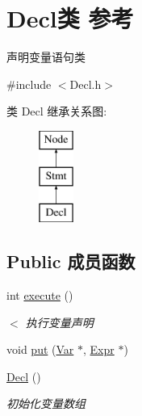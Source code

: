 \hypertarget{class_decl}{}\section{Decl类 参考}
\label{class_decl}


声明变量语句类  




{\ttfamily \#include $<$Decl.\+h$>$}

类 Decl 继承关系图\+:\begin{figure}[H]
\begin{center}
\leavevmode
\includegraphics[height=3.000000cm]{class_decl}
\end{center}
\end{figure}
\subsection*{Public 成员函数}
\begin{DoxyCompactItemize}
\item 
int \hyperlink{class_decl_ad6495a4245a45dcdcd05e239c8db4a8b}{execute} ()\hypertarget{class_decl_ad6495a4245a45dcdcd05e239c8db4a8b}{}\label{class_decl_ad6495a4245a45dcdcd05e239c8db4a8b}

\begin{DoxyCompactList}\small\item\em $<$ 执行变量声明 \end{DoxyCompactList}\item 
void \hyperlink{class_decl_a4c91db9c289b90f3045783f6bf53a688}{put} (\hyperlink{class_var}{Var} $\ast$, \hyperlink{class_expr}{Expr} $\ast$)
\item 
\hyperlink{class_decl_a356b82bee7d66a98c8fbb3547836b785}{Decl} ()\hypertarget{class_decl_a356b82bee7d66a98c8fbb3547836b785}{}\label{class_decl_a356b82bee7d66a98c8fbb3547836b785}

\begin{DoxyCompactList}\small\item\em 初始化变量数组 \end{DoxyCompactList}\end{DoxyCompactItemize}
